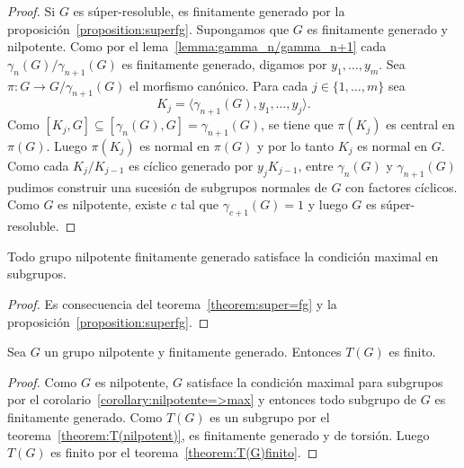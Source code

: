 \begin{proof}
	Si $G$ es súper-resoluble, es finitamente generado por la
	proposición~\ref{proposition:superfg}.  Supongamos que $G$ es finitamente
	generado y nilpotente. Como por el lema~\ref{lemma:gamma_n/gamma_n+1} cada
	$\gamma_{n}(G)/\gamma_{n+1}(G)$ es finitamente generado, digamos por
	$y_1,\dots,y_m$. Sea $\pi\colon G\to G/\gamma_{n+1}(G)$ el morfismo
	canónico.  Para cada $j\in\{1,\dots,m\}$ sea 
	\[
	K_j=\langle \gamma_{n+1}(G),y_1,\dots,y_j\rangle.
	\]
	Como
	$[K_j,G]\subseteq [\gamma_n(G),G]=\gamma_{n+1}(G)$, 
	se tiene que $\pi(K_j)$ es central en $\pi(G)$. Luego $\pi(K_j)$ es normal
	en $\pi(G)$ y por lo tanto $K_j$ es normal en $G$. Como cada $K_j/K_{j-1}$
	es cíclico generado por $y_jK_{j-1}$, entre $\gamma_n(G)$ y
	$\gamma_{n+1}(G)$ pudimos construir una sucesión de subgrupos normales de
	$G$ con factores cíclicos. Como $G$ es nilpotente, existe $c$ tal que
	$\gamma_{c+1}(G)=1$ y luego $G$ es súper-resoluble.
\end{proof}

\begin{corollary}
	\label{corollary:nilpotente=>max}
	Todo grupo nilpotente finitamente generado satisface la condición maximal
	en subgrupos.
\end{corollary}

\begin{proof}
	Es consecuencia del teorema~\ref{theorem:super=fg} y la
	proposición~\ref{proposition:superfg}.
\end{proof}

\begin{theorem}
	Sea $G$ un grupo nilpotente y finitamente generado. Entonces $T(G)$ es
	finito.
\end{theorem}

\begin{proof}
	Como $G$ es nilpotente, $G$ satisface la condición maximal para subgrupos
	por el corolario~\ref{corollary:nilpotente=>max} y entonces
	todo subgrupo de $G$ es finitamente generado. Como $T(G)$ es un subgrupo por el teorema~\ref{theorem:T(nilpotent)}, 
	es finitamente generado y de torsión. Luego $T(G)$ es finito por el
	teorema~\ref{theorem:T(G)finito}.
\end{proof}



